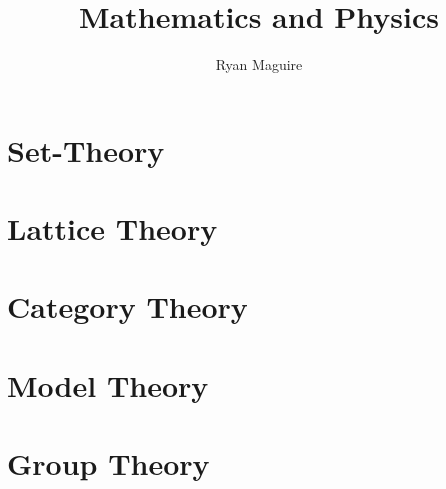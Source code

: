 \documentclass[oneside]{book}                                                  %
\title{Mathematics and Physics}                                                %
\author{Ryan Maguire}                                                          %
\date{\vspace{-5ex}}                                                           %
\newcommand*{\TOPPATH}{books}
\newcommand*{\PATH}{\TOPPATH/}
\newcounter{endpage}
\begin{document}
    \maketitle
    \tableofcontents
    \listoffigures
    \listoftables
    \clearpage
        \label{book:Foundations}
        \renewcommand{\PATH}{\TOPPATH/Foundations}
        \part{Set-Theory}
            
        \part{Lattice Theory}
            
        \part{Category Theory}
            
        \part{Model Theory}
            
    \clearpage

    \setcounter{endpage}{\thepage}
        \label{book:Algebra}%
        \renewcommand{\PATH}{\TOPPATH/Algebra}
        \setcounter{page}{\value{endpage}}
        \part{Group Theory}
            
    \clearpage
\end{document}
